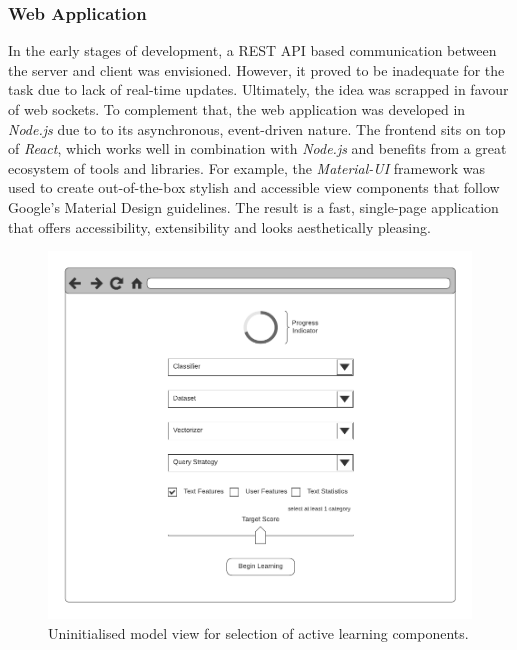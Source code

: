 \documentclass[a4paper,12pt]{article}
\begin{document}
\subsubsection{Web Application}
In the early stages of development, a REST API based communication between the server and client was envisioned. However, it proved to be inadequate for the task due to lack of real-time updates. Ultimately, the idea was scrapped in favour of web sockets. To complement that, the web application was developed in \emph{Node.js} due to to its asynchronous, event-driven nature. The frontend sits on top of \emph{React}, which works well in combination with \emph{Node.js} and benefits from a great ecosystem of tools and libraries. For example, the \emph{Material-UI} framework was used to create out-of-the-box stylish and accessible view components that follow Google's Material Design guidelines. The result is a fast, single-page application that offers accessibility, extensibility and looks aesthetically pleasing.
\begin{figure}[H]
\centering
\includegraphics[scale=0.90]{options_wireframe.pdf}
\captionsetup{justification=centering}
\caption{\label{fig:optionsview}Uninitialised model view for selection of active learning components.}
\end{figure}
\end{document}
